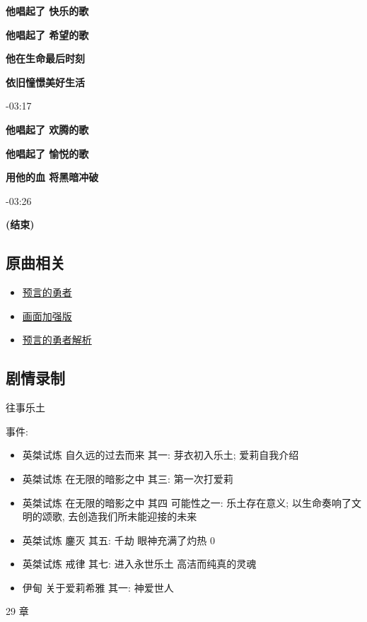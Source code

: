 \documentclass[a4paper]{article}
\begin{document}
\textbf{他唱起了 快乐的歌}

\textbf{他唱起了 希望的歌}

\textbf{他在生命最后时刻}

\textbf{依旧憧憬美好生活}

-03:17

\textbf{他唱起了 欢腾的歌}

\textbf{他唱起了 愉悦的歌}

\textbf{用他的血 将黑暗冲破}

-03:26

\textbf{(结束)}

\subsection{原曲相关}

\begin{itemize}
    \item \href{https://www.bilibili.com/video/BV1Zf4y1Z75m/}{预言的勇者}
    \item \href{https://www.bilibili.com/video/BV1rr4y177C9/}{画面加强版}
    \item \href{https://www.bilibili.com/video/BV1KT411z7Vr/}{预言的勇者解析}
\end{itemize}

\subsection{剧情录制}

往事乐土

事件:

\begin{itemize}
    \item 英桀试炼 自久远的过去而来 其一: 芽衣初入乐土; 爱莉自我介绍
    \item 英桀试炼 在无限的暗影之中 其三: 第一次打爱莉
    \item 英桀试炼 在无限的暗影之中 其四 可能性之一: 乐土存在意义; 以生命奏响了文明的颂歌, 去创造我们所未能迎接的未来
    \item 英桀试炼 鏖灭 其五: 千劫 眼神充满了灼热 0
    \item 英桀试炼 戒律 其七: 进入永世乐土 高洁而纯真的灵魂
    \item 伊甸 关于爱莉希雅 其一: 神爱世人
\end{itemize}

29 章
\end{document}
